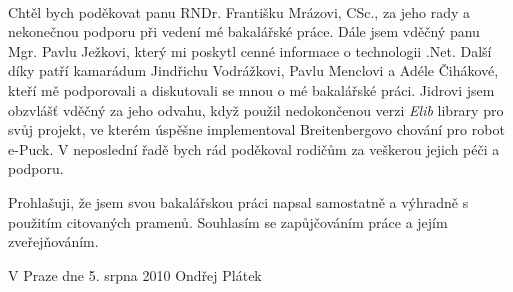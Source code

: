 \documentclass[12pt,notitlepage]{report}
\begin{document}
\normalsize %
\ \vspace{10mm} 

\noindent  Chtěl bych poděkovat panu RNDr. Františku Mrázovi, CSc., za jeho rady
a nekonečnou podporu při vedení mé bakalářské práce. Dále jsem vděčný panu Mgr. Pavlu Ježkovi, který
mi poskytl cenné informace o technologii .Net. 
Další díky patří kamarádum Jindřichu Vodrážkovi, Pavlu Menclovi a Adéle Čihákové,
kteří mě podporovali a diskutovali se mnou o mé bakalářské práci.
Jidrovi jsem obzvlášť vděčný za jeho odvahu, když použil nedokončenou verzi {\it Elib} library pro svůj projekt,
ve kterém úspěšne implementoval Breitenbergovo chování pro robot e-Puck.
V neposlední řadě bych rád poděkoval rodičům za veškerou jejich péči a podporu.

\vspace{\fill} %
\noindent Prohlašuji, že jsem svou bakalářskou práci napsal samostatně a výhradně s použitím citovaných pramenů. Souhlasím se zapůjčováním práce a jejím zveřejňováním.

\bigskip
\noindent V Praze dne 5. srpna 2010 \hspace{\fill}Ondřej Plátek\\ 

\end{document}
